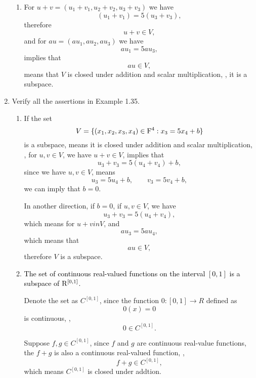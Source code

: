 \begin{enumerate}
\begin{solution}
\begin{enumerate}[label=(\alph*)]
                \item For $u + v = (u_1+v_1, u_2+v_2, u_3+v_3)$ we have 
                    \[ (u_1 + v_1) = 5(u_3+v_3) ,\]
                    therefore 
                    \[ u + v \in V ,\]
                    and for $au = (au_1, au_2, au_3)$ we have 
                    \[ au_1 = 5au_3,\]
                    implies that 
                    \[ au \in V,\]
                    means that $V$ is closed under addition and scalar multiplication, \ie, it is a subspace.
            \end{enumerate}
        \end{solution}
    \item Verify all the assertions in Example 1.35.
        \begin{solution}
            \begin{enumerate}[label=(\alph*)]
                \item If the set 
                    \[ V = \{(x_1, x_2, x_3, x_4) \in \mathrm{F}^4: x_3 = 5x_4 + b\}\]
                    is a subspace, means it is closed under addition and scalar multiplication, \ie, 
                    for $u, v \in V$, we have $u + v \in V$, implies that 
                    \[ u_3 + v_3 = 5(u_4 + v_4) + b, \]
                    since we have $u, v \in V$, means 
                    \[ u_3 = 5u_4 + b, \qquad v_3 = 5v_4 + b,\]
                    we can imply that $b = 0$.

                    In another direction, if $b=0$, if $u, v \in V$, we have 
                    \[ u_3 + v_3 = 5(u_4 + v_4),\]
                    which means for $u + v in V$, 
                    and 
                    \[ au_3 = 5au_4,\]
                    which means that 
                    \[ au \in V,\]
                    therefore $V$ is a subspace.
                \item \textcolor{black}{The set of continuous real-valued functions on the interval $[0,1]$ is a subspace of $\mathrm{R}^{[0,1]}$.}
                    
                    Denote the set as $C^{[0,1]}$, since the function $0: [0,1] \to R$ defined as 
                    \[ 0(x) = 0 \]
                    is continuous, \ie, 
                    \[ 0 \in C^{[0,1]}.\]
                    
                    Suppose $f,g \in C^{[0,1]}$, since $f$ and $g$ are continuous real-value functions,
                    the $f + g$ is also a continuous real-valued function, \ie, 
                    \[ f + g \in C^{[0,1]},\] 
                    which means $C^{[0,1]}$ is closed under addtion.


\end{enumerate}
\end{solution}
\end{enumerate}
